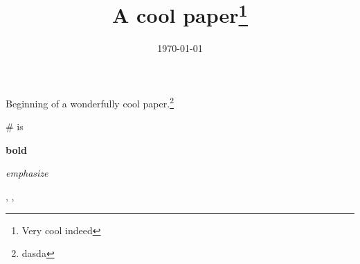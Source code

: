 \documentclass[]{article}
\title{A cool paper\footnote{Very cool indeed}}
\author{}
\date{\today}
\begin{document}
\maketitle

\begin{abstract}

\end{abstract}

\section{}

Beginning of a wonderfully cool paper.\footnote{dasda}

\# is 

\textbf{bold}

\textit{emphasize}

\cite{Bayer2004}, \cite{Abreu2005b}, \cite{Bernasco2010}



\end{document}
